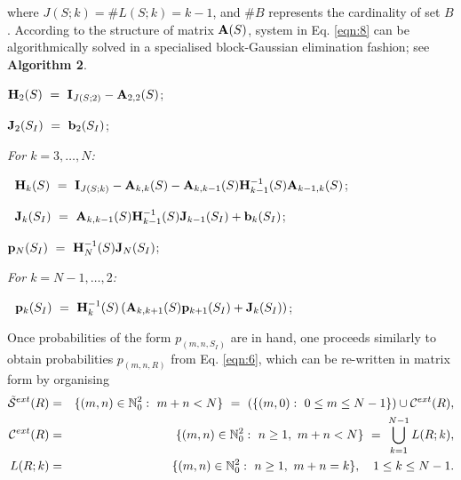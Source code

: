 \documentclass[preprint,12pt]{elsarticle}
\begin{document}
\par\noindent where $J(S;k)=\# L(S;k)=k-1$, and $\#B$ represents the cardinality of set $B$. According to the structure of matrix ${\bf A}(S)$,
system in Eq. \eqref{eqn:8} can be algorithmically solved in a specialised block-Gaussian elimination fashion; see {\bf Algorithm 2}.

\vspace{0.5cm}
\par {}
\begin{description}
  \item ${\bf H}_2(S) ~=~ {\bf I}_{J(S;2)}-{\bf A}_{2,2}(S)$;
  \item ${\bf J}_2(S_I) ~=~ {\bf b}_2(S_I)$;
  \item \it For $k=3,\dots,N$:
  \item $~$\hspace{0.5cm} ${\bf H}_k(S) ~=~ {\bf I}_{J(S;k)}-{\bf A}_{k,k}(S)-{\bf A}_{k,k-1}(S){\bf H}_{k-1}^{-1}(S){\bf A}_{k-1,k}(S)$;
  \item $~$\hspace{0.5cm} ${\bf J}_k(S_I) ~=~ {\bf A}_{k,k-1}(S){\bf H}_{k-1}^{-1}(S){\bf J}_{k-1}(S_I)+{\bf b}_k(S_I)$;
  \item ${\bf p}_N(S_I) ~=~ {\bf H}_N^{-1}(S){\bf J}_N(S_I)$;
  \item \it For $k=N-1,\dots,2$:
  \item $~$\hspace{0.5cm} ${\bf p}_k(S_I) ~=~ {\bf H}_k^{-1}(S)\left({\bf A}_{k,k+1}(S){\bf p}_{k+1}(S_I)+{\bf J}_k(S_I)\right)$;
\end{description}
\vspace{0.5cm}

\par Once probabilities of the form $p_{(m,n,S_I)}$ are in hand, one proceeds similarly to obtain probabilities $p_{(m,n,R)}$ from Eq. \eqref{eqn:6}, which can be
re-written in matrix form by organising
\begin{eqnarray*}
 {\cal \tilde S}^{ext}(R) &=& \{(m,n)\in\mathbb{N}_0^2:\ m+n< N\} \ = \ \left(\{(m,0):\ 0\leq m\leq N-1\}\right)\cup{\cal C}^{ext}(R),\\
 {\cal C}^{ext}(R) &=& \{(m,n)\in\mathbb{N}_0^2:\ n\geq1,\ m+n< N\} \ = \ \bigcup\limits_{k=1}^{N-1} L(R;k),\\
 L(R;k) &=& \{(m,n)\in\mathbb{N}_0^2:\ n\geq1,\ m+n=k\},\quad 1\leq k\leq N-1.
\end{eqnarray*}
\end{document}
